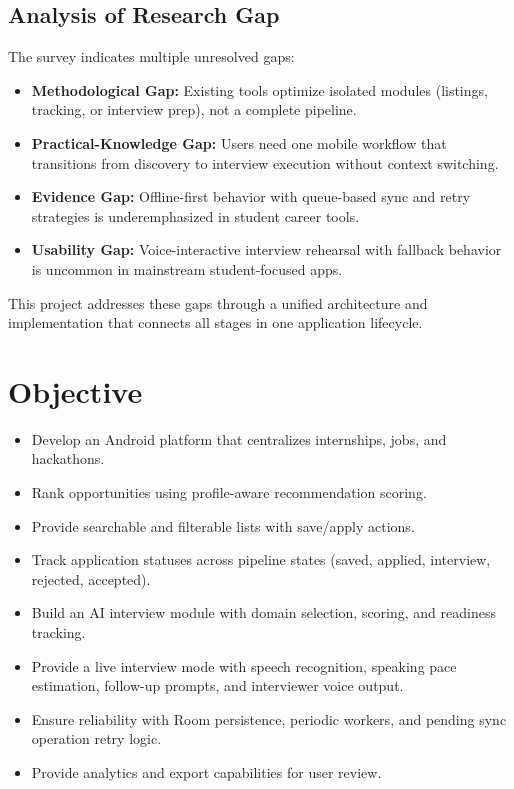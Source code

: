 \documentclass[conference]{IEEEtran}
\begin{document}
\subsection{Analysis of Research Gap}

The survey indicates multiple unresolved gaps:

\begin{itemize}
  \item \textbf{Methodological Gap:} Existing tools optimize isolated modules (listings, tracking, or interview prep), not a complete pipeline.
  \item \textbf{Practical-Knowledge Gap:} Users need one mobile workflow that transitions from discovery to interview execution without context switching.
  \item \textbf{Evidence Gap:} Offline-first behavior with queue-based sync and retry strategies is underemphasized in student career tools.
  \item \textbf{Usability Gap:} Voice-interactive interview rehearsal with fallback behavior is uncommon in mainstream student-focused apps.
\end{itemize}

This project addresses these gaps through a unified architecture and implementation that connects all stages in one application lifecycle.

\section{Objective}

\begin{itemize}
  \item Develop an Android platform that centralizes internships, jobs, and hackathons.
  \item Rank opportunities using profile-aware recommendation scoring.
  \item Provide searchable and filterable lists with save/apply actions.
  \item Track application statuses across pipeline states (saved, applied, interview, rejected, accepted).
  \item Build an AI interview module with domain selection, scoring, and readiness tracking.
  \item Provide a live interview mode with speech recognition, speaking pace estimation, follow-up prompts, and interviewer voice output.
  \item Ensure reliability with Room persistence, periodic workers, and pending sync operation retry logic.
  \item Provide analytics and export capabilities for user review.
\end{itemize}
\end{document}
